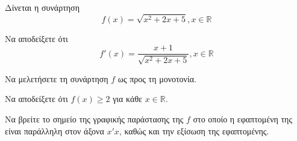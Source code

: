 Δίνεται η συνάρτηση
\[ f(x) = \sqrt{x^2 + 2x + 5}, x \in \mathbb{R} \]
\begin{alist}
\item Να αποδείξετε ότι
\[ f'(x) = \frac{x + 1}{\sqrt{x^2 + 2x + 5}}, x \in \mathbb{R} \]

\item Να μελετήσετε τη συνάρτηση $f$ ως προς τη μονοτονία.

\item Να αποδείξετε ότι $f(x) \geq 2$ για κάθε $x \in \mathbb{R}$.

\item Να βρείτε το σημείο της γραφικής παράστασης της $f$ στο οποίο η εφαπτομένη της είναι παράλληλη στον άξονα $x'x$, καθώς και την εξίσωση της εφαπτομένης.
\end{alist}

